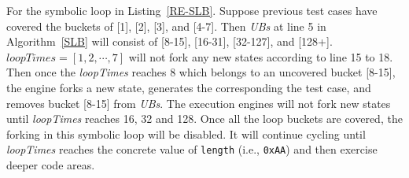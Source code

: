 For the symbolic loop in Listing~\ref{RE-SLB}. Suppose previous 
test cases have covered the buckets of [1], [2], [3], and [4-7]. 
Then \textit{UBs} at line 5 in Algorithm~\ref{SLB} will consist of 
[8-15], [16-31], [32-127], and [128+]. 
$\textit{loopTimes}=[1, 2, \cdots, 7]$ will not fork any new states 
according to line 15 to 18. Then once the \textit{loopTimes} reaches 
8 which belongs to an uncovered bucket [8-15], the engine forks a 
new state,  generates the corresponding the test case, and removes 
bucket [8-15] from \textit{UBs}. The execution engines will not 
fork new states until \textit{loopTimes} reaches 16, 32 and 128. 
Once all the loop buckets are covered, the forking in this 
symbolic loop will be disabled. It will continue cycling until 
\textit{loopTimes} reaches the concrete value of \texttt{length} 
(i.e., \texttt{0xAA}) and then exercise deeper code areas.

